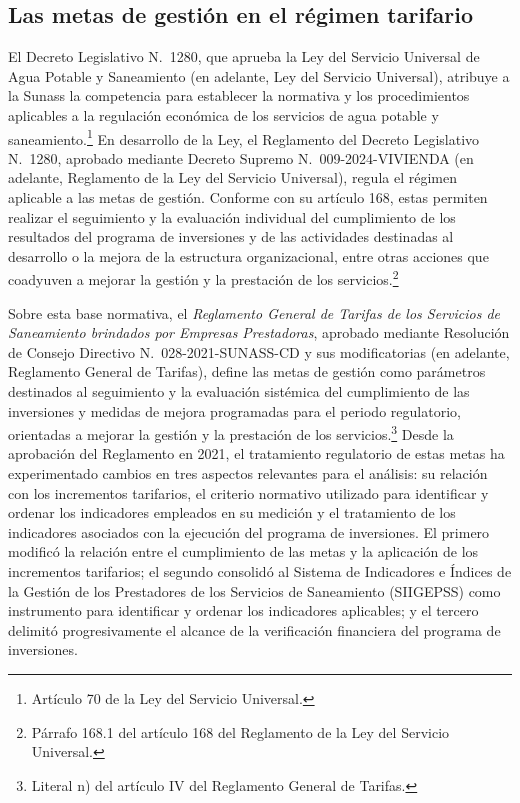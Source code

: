 \subsection{Las metas de gestión en el régimen tarifario}

El Decreto Legislativo N.\textdegree~1280, que aprueba la Ley del Servicio Universal de Agua Potable y Saneamiento (en adelante, Ley del Servicio Universal), atribuye a la Sunass la competencia para establecer la normativa y los procedimientos aplicables a la regulación económica de los servicios de agua potable y saneamiento.\footnote{Artículo 70 de la Ley del Servicio Universal.} En desarrollo de la Ley, el Reglamento del Decreto Legislativo N.\textdegree~1280, aprobado mediante Decreto Supremo N.\textdegree~009-2024-VIVIENDA (en adelante, Reglamento de la Ley del Servicio Universal), regula el régimen aplicable a las metas de gestión. Conforme con su artículo 168, estas permiten realizar el seguimiento y la evaluación individual del cumplimiento de los resultados del programa de inversiones y de las actividades destinadas al desarrollo o la mejora de la estructura organizacional, entre otras acciones que coadyuven a mejorar la gestión y la prestación de los servicios.\footnote{Párrafo 168.1 del artículo 168 del Reglamento de la Ley del Servicio Universal.}

Sobre esta base normativa, el \textit{Reglamento General de Tarifas de los Servicios de Saneamiento brindados por Empresas Prestadoras}, aprobado mediante Resolución de Consejo Directivo N.\textdegree~028-2021-SUNASS-CD y sus modificatorias (en adelante, Reglamento General de Tarifas), define las metas de gestión como parámetros destinados al seguimiento y la evaluación sistémica del cumplimiento de las inversiones y medidas de mejora programadas para el periodo regulatorio, orientadas a mejorar la gestión y la prestación de los servicios.\footnote{Literal n) del artículo IV del Reglamento General de Tarifas.} Desde la aprobación del Reglamento en 2021, el tratamiento regulatorio de estas metas ha experimentado cambios en tres aspectos relevantes para el análisis: su relación con los incrementos tarifarios, el criterio normativo utilizado para identificar y ordenar los indicadores empleados en su medición y el tratamiento de los indicadores asociados con la ejecución del programa de inversiones. El primero modificó la relación entre el cumplimiento de las metas y la aplicación de los incrementos tarifarios; el segundo consolidó al Sistema de Indicadores e Índices de la Gestión de los Prestadores de los Servicios de Saneamiento (SIIGEPSS) como instrumento para identificar y ordenar los indicadores aplicables; y el tercero delimitó progresivamente el alcance de la verificación financiera del programa de inversiones.

